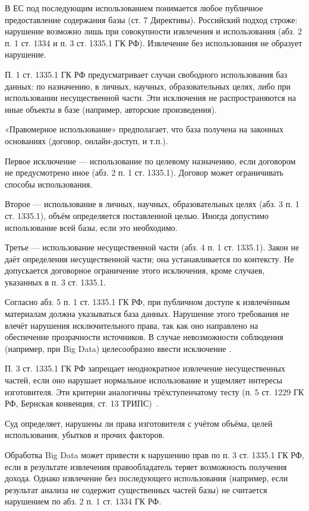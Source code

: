 В ЕС под последующим использованием понимается любое публичное предоставление
содержания базы (ст. 7 Директивы). Российский подход строже: нарушение возможно
лишь при совокупности извлечения и использования (абз. 2 п. 1 ст. 1334 и п. 3
ст. 1335.1 ГК РФ). Извлечение без использования не образует нарушение.

П. 1 ст. 1335.1 ГК РФ предусматривает случаи свободного использования баз
данных: по назначению, в личных, научных, образовательных целях, либо при
использовании несущественной части. Эти исключения не распространяются на иные
объекты в базе (например, авторские произведения).

«Правомерное использование» предполагает, что база получена на законных
основаниях (договор, онлайн-доступ, и т.п.).

Первое исключение — использование по целевому назначению, если договором не
предусмотрено иное (абз. 2 п. 1 ст. 1335.1). Договор может ограничивать способы
использования.

Второе — использование в личных, научных, образовательных целях (абз. 3 п. 1
ст. 1335.1), объём определяется поставленной целью. Иногда допустимо
использование всей базы, если это необходимо.

Третье — использование несущественной части (абз. 4 п. 1 ст. 1335.1). Закон не
даёт определения несущественной части; она устанавливается по
контексту. Не допускается договорное ограничение этого исключения,
кроме случаев, указанных в п. 3 ст. 1335.1.

Согласно абз. 5 п. 1 ст. 1335.1 ГК РФ, при публичном доступе к извлечённым
материалам должна указываться база данных. Нарушение этого требования не влечёт
нарушения исключительного права, так как оно направлено на обеспечение
прозрачности источников. В случае невозможности соблюдения
(например, при Big Data) целесообразно ввести исключение \cite{geiger2020tdm}.

П. 3 ст. 1335.1 ГК РФ запрещает неоднократное извлечение несущественных частей,
если оно нарушает нормальное использование и ущемляет интересы изготовителя.
Эти критерии аналогичны трёхступенчатому тесту (п. 5 ст. 1229 ГК РФ, Бернская
конвенция, ст. 13 ТРИПС)~\cite{hug}.

Суд определяет, нарушены ли права изготовителя с учётом объёма, целей
использования, убытков и прочих факторов.

Обработка Big Data может привести к нарушению прав по п. 3 ст. 1335.1 ГК РФ,
если в результате извлечения правообладатель теряет возможность получения
дохода. Однако извлечение без последующего использования (например, если
результат анализа не содержит существенных частей базы) не считается нарушением
по абз. 2 п. 1 ст. 1334 ГК РФ.
